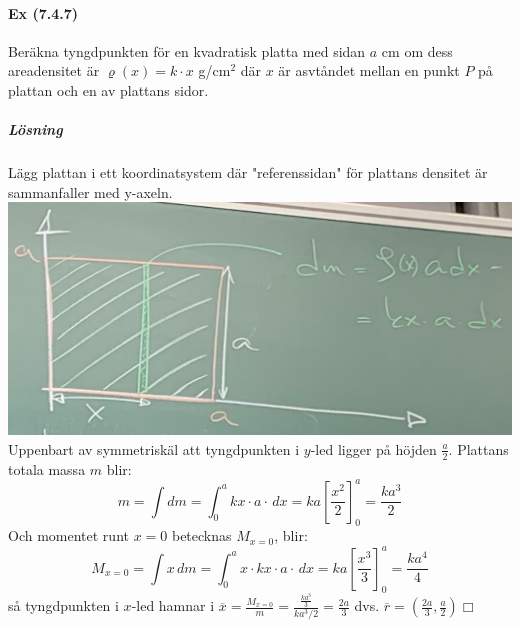 \paragraph{Ex (7.4.7)} Beräkna tyngdpunkten för en kvadratisk platta med sidan $a$ cm om dess areadensitet är $\varrho(x)=k\cdot x$ g/cm$^2$ där $x$ är asvtåndet mellan en punkt $P$ på plattan och en av plattans sidor.
\subparagraph{Lösning}
Lägg plattan i ett koordinatsystem där "referenssidan" för plattans densitet är sammanfaller med y-axeln.\\
\includegraphics[scale=0.1]{lessons/lesson20/imgs/img03.jpg}\\
Uppenbart av symmetriskäl att tyngdpunkten i $y$-led ligger på höjden $\frac{a}{2}$.
Plattans totala massa $m$ blir:
\begin{equation*}
    m=\int dm=\int_0^a kx\cdot a\cdot\, dx=ka[\frac{x^2}{2}]_0^a=\frac{ka^3}{2}
\end{equation*}
Och momentet runt $x=0$ betecknas $M_{x=0}$, blir:
\begin{equation*}
    M_{x=0}=\int x\, dm=\int_0^a x\cdot kx\cdot a\cdot\, dx=ka[\frac{x^3}{3}]_0^a=\frac{ka^4}{4}
\end{equation*}
så tyngdpunkten i $x$-led hamnar i $\overline{x}=\frac{M_{x=0}}{m}=\frac{\frac{ka^3}{3}}{ka^3/2}=\frac{2a}{3}$
dvs. $\overline{r}=(\frac{2a}{3},\frac{a}{2}) \Box$

